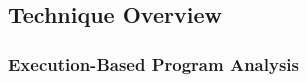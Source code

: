 \subsection{Technique Overview}
\label{sec:adapt-intro-overview}
\subsubsection{Execution-Based Program Analysis}
\label{sec:intro-exe}
